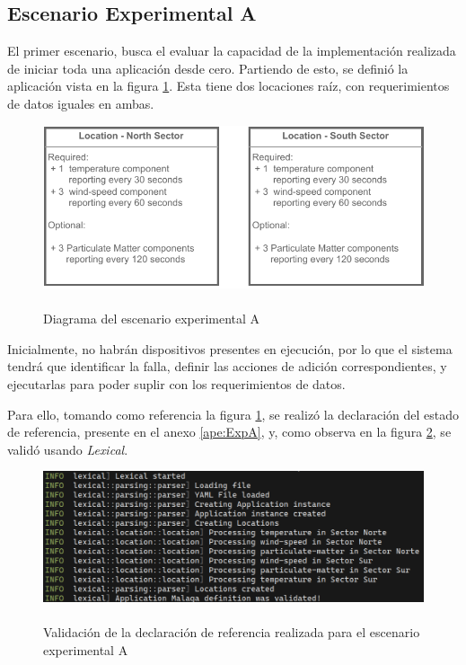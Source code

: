 \subsection{Escenario Experimental A} \label{sec:EscenarioExperimentalA}

El primer escenario, busca el evaluar la capacidad de la implementación realizada de iniciar toda una aplicación desde cero. Partiendo de esto, se definió la aplicación vista en la figura \ref{fig:ExpA}. Esta tiene dos locaciones raíz, con requerimientos de datos iguales en ambas.

\begin{figure}[H]
    \centering
    \caption{\\Diagrama del escenario experimental A}
    \label{fig:ExpA}
    \includegraphics[width=0.8\linewidth]{images/ScenarioA.pdf}
    \vspace{-4mm}
\end{figure}

Inicialmente, no habrán dispositivos presentes en ejecución, por lo que el sistema tendrá que identificar la falla, definir las acciones de adición correspondientes, y ejecutarlas para poder suplir con los requerimientos de datos.

Para ello, tomando como referencia la figura \ref{fig:ExpA}, se realizó la declaración del estado de referencia, presente en el anexo \ref{ape:ExpA}, y, como observa en la figura \ref{fig:ValidA}, se validó usando \textit{Lexical}.

\begin{figure}[H]
    \centering
    \caption{\\Validación de la declaración de referencia realizada para el escenario experimental A}
    \label{fig:ValidA}
    \includegraphics[width=0.7\linewidth]{images/ValidationLexicalA.png}
    \vspace{-4mm}
\end{figure}

